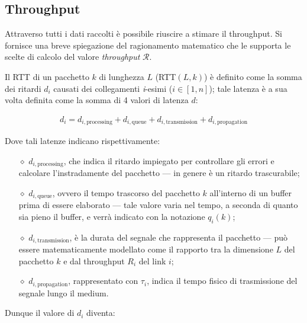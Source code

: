 \vspace{15px}\subsection{Throughput}\label{throughput}

Attraverso tutti i dati raccolti è possibile riuscire a stimare il throughput. Si fornisce una breve spiegazione del ragionamento matematico che le supporta le scelte di calcolo del valore \textsl{throughput} $\mathcal{R}$.


Il RTT di un pacchetto $k$ di lunghezza $L$ (RTT$(L, k)$) è definito come la somma dei ritardi $d_i$ causati dei collegamenti \textit{i}-esimi ($i \in [1, n]$); tale latenza è a sua volta definita come la somma di 4 valori di latenza $d$:

\begin{gather*}
    d_i = d_{i, \text{processing}} + d_{i, \text{queue}} + d_{i, \text{transmission}} + d_{i, \text{propagation}}
\end{gather*}

\noindent Dove tali latenze indicano rispettivamente:

\vspace{-3px}
\begin{itemize}
    \setlength{\itemsep}{-2px}
    \item[$\diamond$] $d_{i, \text{processing}}$, che indica il ritardo impiegato per controllare gli errori e calcolare l'instradamente del pacchetto — in genere è un ritardo trascurabile;
    \item[$\diamond$] $d_{i, \text{queue}}$, ovvero il tempo trascorso del pacchetto $k$ all'interno di un buffer prima di essere elaborato — tale valore varia nel tempo, a seconda di quanto sia pieno il buffer, e verrà indicato con la notazione $q_i(k)$;
    \item[$\diamond$] $d_{i, \text{transmission}}$, è la durata del segnale che rappresenta il pacchetto — può essere matematicamente modellato come il rapporto tra la dimensione $L$ del pacchetto $k$ e dal throughput $R_i$ del link $i$;
    \item[$\diamond$] $d_{i, \text{propagation}}$, rappresentato con $\tau_i$, indica il tempo fisico di trasmissione del segnale lungo il medium.
\end{itemize}

\noindent Dunque il valore di $d_i$ diventa:

